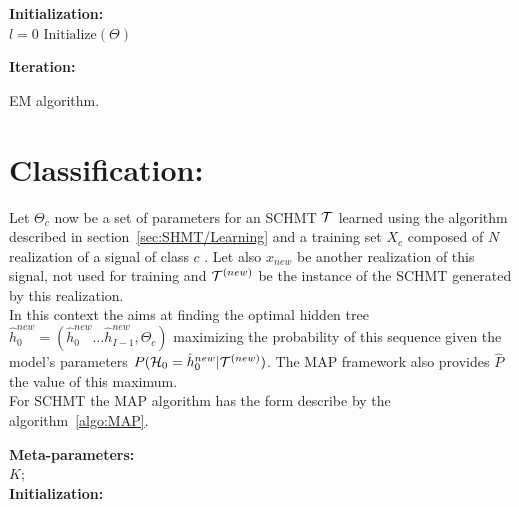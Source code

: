 \documentclass[a4paper,11pt]{report}
\begin{document}
{\begin{center}
\begin{algorithm}
					\textbf{Initialization:}\\
						$l=0$ 
						$\text{Initialize}(\Theta)$
					
					\textbf{Iteration:}\\
					\caption{EM algorithm.}
					\label{algo:EM}
				\end{algorithm}        
			\end{center}
			    
  \section{Classification:}
    \label{sec:SHMT/Clf}
    
    Let $\Theta_{c}$ now be a set of parameters for an SCHMT $\mathcal{T}$ learned using the algorithm described in section~\ref{sec:SHMT/Learning} and a training set $X_{c}$ composed of $N$ realization of a signal of class $c$ . Let also $x_{new}$ be another realization of this signal, not used for training and $\mathcal{T}^{(new)}$ be the instance of the SCHMT generated by this realization.\\
    
    In this context the  aims at finding the optimal hidden tree $\hat{h}_{0}^{new}=(\hat{h}_{0}^{new} \dots \hat{h}_{I-1}^{new},\Theta_{c})$ maximizing the probability of this sequence given the model's parameters $P(\mathcal{H}_{0}= \hat{h}_{0}^{new}|\mathcal{T}^{(new)})$. The MAP framework also provides $\hat{P}$ the value of this maximum.\\
    
    For SCHMT the MAP algorithm has the form describe by the algorithm~\ref{algo:MAP}.
    
		\begin{center}
			\begin{algorithm}
				\textbf{Meta-parameters:}\\
					$K$;\\
					
				\textbf{Initialization:}\\
					

\end{algorithm}
\end{center}}
\end{document}
